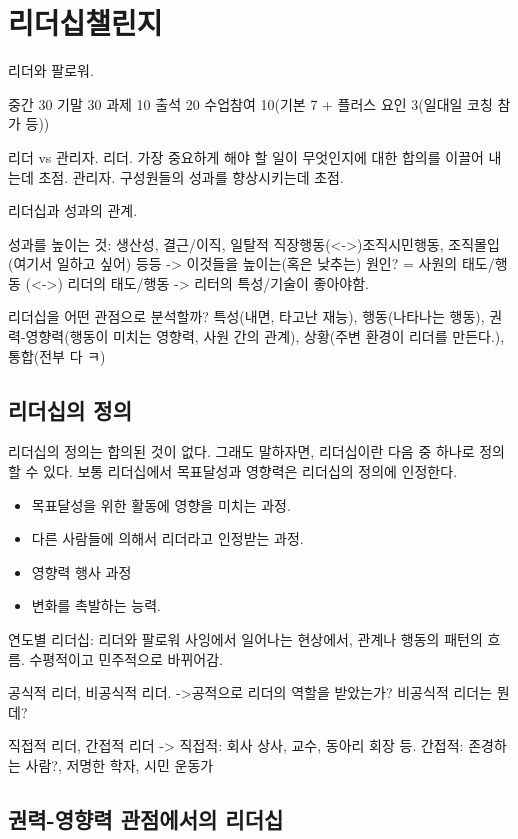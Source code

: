 \chapter{리더십챌린지}

리더와 팔로워.

중간 30 기말 30 과제 10 출석 20 수업참여 10(기본 7 + 플러스 요인 3(일대일 코칭 참가 등))

리더 vs 관리자.
리더. 가장 중요하게 해야 할 일이 무엇인지에 대한 합의를 이끌어 내는데 초점.
관리자. 구성원들의 성과를 향상시키는데 초점.

리더십과 성과의 관계.

성과를 높이는 것: 생산성, 결근/이직, 일탈적 직장행동(<->)조직시민행동, 조직몰입(여기서 일하고 싶어) 등등
-> 이것들을 높이는(혹은 낮추는) 원인?
= 사원의 태도/행동 (<->) 리더의 태도/행동
-> 리터의 특성/기술이 좋아야함.

리더십을 어떤 관점으로 분석할까? 
특성(내면, 타고난 재능), 행동(나타나는 행동), 권력-영향력(행동이 미치는 영향력, 사원 간의 관계), 
상황(주변 환경이 리더를 만든다.), 통합(전부 다 ㅋ)

\section{리더십의 정의}
리더십의 정의는 합의된 것이 없다. 그래도 말하자면, 리더십이란 다음 중 하나로 정의할 수 있다. 
보통 리더십에서 목표달성과 영향력은 리더십의 정의에 인정한다.
\begin{itemize}
  \item 목표달성을 위한 활동에 영향을 미치는 과정.
  \item 다른 사람들에 의해서 리더라고 인정받는 과정.
  \item 영향력 행사 과정
  \item 변화를 촉발하는 능력.
\end{itemize}

연도별 리더십: 리더와 팔로워 사잉에서 일어나는 현상에서, 관계나 행동의 패턴의 흐름.
수평적이고 민주적으로 바뀌어감.

공식적 리더, 비공식적 리더.
->공적으로 리더의 역할을 받았는가?
비공식적 리더는 뭔데?

직접적 리더, 간접적 리더
-> 직접적: 회사 상사, 교수, 동아리 회장 등. 간접적: 존경하는 사람?, 저명한 학자, 시민 운동가

\section{권력-영향력 관점에서의 리더십}

